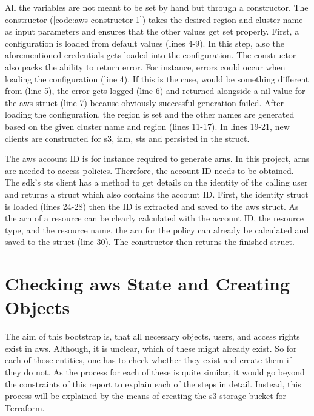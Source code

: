 

All the variables are not meant to be set by hand but through a constructor.
The constructor (\autoref{code:aws-constructor-1}) takes the desired region and cluster name as input parameters and ensures that the other values get set properly.
First, a configuration is loaded from default values (lines 4-9).
In this step, also the aforementioned credentials gets loaded into the configuration.
The constructor also packs the ability to return error.
For instance, errors could occur when loading the configuration (line 4).
If this is the case,  would be something different from  (line 5), the error gets logged (line 6) and returned alongside a nil value for the \ac{aws} struct (line 7) because obviously successful generation failed.
After loading the configuration, the region is set and the other names are generated based on the given cluster name and region (lines 11-17).
In lines 19-21, new clients are constructed for \ac{s3}, \ac{iam}, \ac{sts} and persisted in the struct.

The \ac{aws} account ID is for instance required to generate \acp{arn}.
In this project, \acp{arn} are needed to access policies.
Therefore, the account ID needs to be obtained.
The \ac{sdk}'s \ac{sts} client has a method to get details on the identity of the calling user and returns a struct which also contains the account ID.
First, the identity struct is loaded (lines 24-28) then the ID is extracted and saved to the \ac{aws} struct.
As the \ac{arn} of a resource can be clearly calculated with the account ID, the resource type, and the resource name, the \ac{arn} for the policy can already be calculated and saved to the struct (line 30).
The constructor then returns the finished struct.



\section{Checking \ac{aws} State and Creating Objects}
The aim of this bootstrap is, that all necessary objects, users, and access rights exist in \ac{aws}.
Although, it is unclear, which of these might already exist.
So for each of those entities, one has to check whether they exist and create them if they do not.
As the process for each of these is quite similar, it would go beyond the constraints of this report to explain each of the steps in detail.
Instead, this process will be explained by the means of creating the \ac{s3} storage bucket for Terraform.

